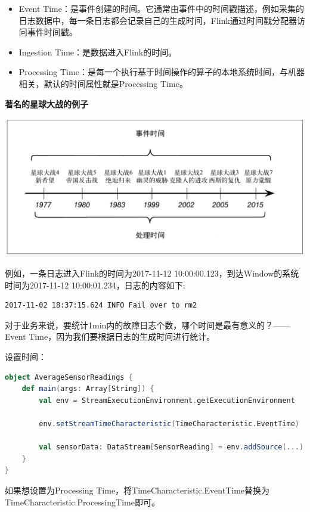 \documentclass[oneside]{ctexbook}
\begin{document}
\begin{itemize}
\item Event Time：是事件创建的时间。它通常由事件中的时间戳描述，例如采集的日志数据中，每一条日志都会记录自己的生成时间，Flink通过时间戳分配器访问事件时间戳。
\item Ingestion Time：是数据进入Flink的时间。
\item Processing Time：是每一个执行基于时间操作的算子的本地系统时间，与机器相关，默认的时间属性就是Processing Time。
\end{itemize}

\textbf{著名的星球大战的例子}

\noindent \includegraphics[width=\textwidth]{starwars.png}

例如，一条日志进入Flink的时间为2017-11-12 10:00:00.123，到达Window的系统时间为2017-11-12 10:00:01.234，日志的内容如下:

\begin{lstlisting}
2017-11-02 18:37:15.624 INFO Fail over to rm2
\end{lstlisting}

对于业务来说，要统计1min内的故障日志个数，哪个时间是最有意义的？—— Event Time，因为我们要根据日志的生成时间进行统计。

设置时间：

\begin{lstlisting}[language=scala]
object AverageSensorReadings {
    def main(args: Array[String]) {
        val env = StreamExecutionEnvironment.getExecutionEnvironment

        env.setStreamTimeCharacteristic(TimeCharacteristic.EventTime)

        val sensorData: DataStream[SensorReading] = env.addSource(...)
    }
}
\end{lstlisting}

如果想设置为Processing Time，将TimeCharacteristic.EventTime替换为TimeCharacteristic.ProcessingTime即可。
\end{document}
